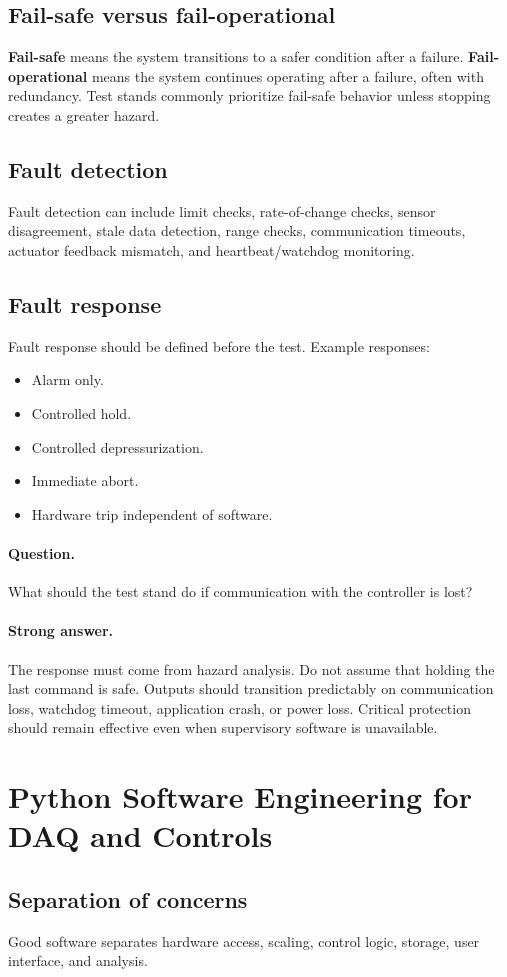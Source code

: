 \documentclass[11pt]{article}
\newcommand{\question}[1]{\paragraph{Question.} #1}
\newcommand{\stronganswer}[1]{\paragraph{Strong answer.} #1}
\begin{document}
\subsection{Fail-safe versus fail-operational}
\textbf{Fail-safe} means the system transitions to a safer condition after a
failure. \textbf{Fail-operational} means the system continues operating after a
failure, often with redundancy. Test stands commonly prioritize fail-safe
behavior unless stopping creates a greater hazard.

\subsection{Fault detection}
Fault detection can include limit checks, rate-of-change checks, sensor
disagreement, stale data detection, range checks, communication timeouts,
actuator feedback mismatch, and heartbeat/watchdog monitoring.

\subsection{Fault response}
Fault response should be defined before the test. Example responses:
\begin{itemize}
  \item Alarm only.
  \item Controlled hold.
  \item Controlled depressurization.
  \item Immediate abort.
  \item Hardware trip independent of software.
\end{itemize}

\question{What should the test stand do if communication with the controller is lost?}
\stronganswer{The response must come from hazard analysis. Do not assume that
holding the last command is safe. Outputs should transition predictably on
communication loss, watchdog timeout, application crash, or power loss. Critical
protection should remain effective even when supervisory software is unavailable.}

\section{Python Software Engineering for DAQ and Controls}

\subsection{Separation of concerns}
Good software separates hardware access, scaling, control logic, storage, user
interface, and analysis.
\end{document}
